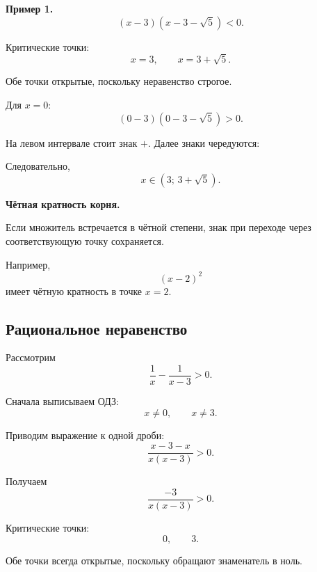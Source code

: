 \documentclass[a4paper,12pt]{article}
\newcommand{\key}[1]{%
  \textbf{\color{darkaccent}#1}%
}
\begin{document}
\textbf{Пример 1.}
\[
(x-3)(x-3-\sqrt5)<0.
\]

Критические точки:
\[
x=3,
\qquad
x=3+\sqrt5.
\]

Обе точки открытые, поскольку неравенство строгое.

Для \(x=0\):
\[
(0-3)(0-3-\sqrt5)>0.
\]

На левом интервале стоит знак \(+\).
Далее знаки чередуются:

\begin{center}
\end{center}

Следовательно,
\[
\boxed{x\in(3;\,3+\sqrt5)}.
\]

\key{Чётная кратность корня.}
Если множитель встречается в чётной степени, знак при переходе через
соответствующую точку сохраняется.

Например,
\[
(x-2)^2
\]
имеет чётную кратность в точке \(x=2\).

\subsection*{Рациональное неравенство}

Рассмотрим
\[
\frac1x-\frac1{x-3}>0.
\]

Сначала выписываем ОДЗ:
\[
x\ne0,
\qquad
x\ne3.
\]

Приводим выражение к одной дроби:
\[
\frac{x-3-x}{x(x-3)}>0.
\]

Получаем
\[
\frac{-3}{x(x-3)}>0.
\]

Критические точки:
\[
0,\qquad3.
\]

Обе точки всегда открытые, поскольку обращают знаменатель в ноль.
\end{document}
